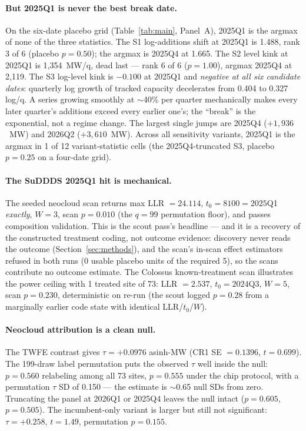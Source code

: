 \documentclass[11pt]{article}
\begin{document}
\paragraph{But 2025Q1 is never the best break date.} On the six-date placebo
grid (Table~\ref{tab:main}, Panel~A), 2025Q1 is the argmax of none of the
three statistics. The S1 log-additions shift at 2025Q1 is 1.488, rank 3 of 6
(placebo $p=0.50$); the argmax is 2025Q4 at 1.665. The S2 level kink at
2025Q1 is 1{,}354~MW/q, dead last --- rank 6 of 6 ($p=1.00$), argmax 2025Q4
at 2{,}119. The S3 log-level kink is $-0.100$ at 2025Q1 and \emph{negative at
all six candidate dates}: quarterly log growth of tracked capacity
decelerates from 0.404 to 0.327 log/q. A series growing smoothly at
$\sim$40\% per quarter mechanically makes every later quarter's additions
exceed every earlier one's; the ``break'' is the exponential, not a regime
change. The largest single jumps are 2025Q4 ($+1{,}936$~MW) and 2026Q2
($+3{,}610$~MW). Across all sensitivity variants, 2025Q1 is the argmax in 1
of 12 variant-statistic cells (the 2025Q4-truncated S3, placebo $p=0.25$ on a
four-date grid).

\paragraph{The SuDDDS 2025Q1 hit is mechanical.} The seeded neocloud scan
returns max LLR $=24.114$, $t_0 = 8100 = 2025$Q1 \emph{exactly}, $W=3$, scan
$p=0.010$ (the $q=99$ permutation floor), and passes composition validation.
This is the scout pass's headline --- and it is a recovery of the constructed
treatment coding, not outcome evidence: discovery never reads the outcome
(Section~\ref{sec:methods}), and the scan's in-scan effect estimators refused
in both runs (0 usable placebo units of the required 5), so the scans
contribute no outcome estimate. The Colossus known-treatment scan illustrates
the power ceiling with 1 treated site of 73: LLR $=2.537$, $t_0=2024$Q3,
$W=5$, scan $p=0.230$, deterministic on re-run (the scout logged $p=0.28$
from a marginally earlier code state with identical LLR/$t_0$/$W$).

\paragraph{Neocloud attribution is a clean null.} The TWFE contrast gives
$\tau = +0.0976$ asinh-MW (CR1 SE $=0.1396$, $t=0.699$). The 199-draw label
permutation puts the observed $\tau$ well inside the null: $p=0.560$
relabeling among all 73 sites, $p=0.555$ under the chip protocol, with a
permutation $\tau$ SD of 0.150 --- the estimate is $\sim$0.65 null SDs from
zero. Truncating the panel at 2026Q1 or 2025Q4 leaves the null intact
($p=0.605$, $p=0.505$). The incumbent-only variant is larger but still not
significant: $\tau=+0.258$, $t=1.49$, permutation $p=0.155$.
\end{document}
